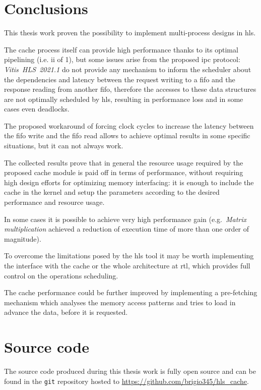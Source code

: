 \documentclass[11pt,a4paper,oneside]{memoir}
\begin{document}
\chapter{Conclusions}
This thesis work proven the possibility to implement multi-process designs in
\ac{hls}.

The cache process itself can provide high performance thanks to its optimal
pipelining (i.e. \ac{ii} of 1), but some issues arise from the proposed
\acl{ipc} protocol: \emph{Vitis~HLS~2021.1} do not provide any mechanism to
inform the scheduler about the dependencies and latency between the request
writing to a \ac{fifo} and the response reading from another \ac{fifo},
therefore the accesses to these data structures are not optimally scheduled by
\ac{hls}, resulting in performance loss and in some cases even deadlocks.

The proposed workaround of forcing clock cycles to increase the latency between
the \ac{fifo} write and the \ac{fifo} read allows to achieve optimal results in
some specific situations, but it can not always work.

\bigskip
The collected results prove that in general the resource usage required by the
proposed cache module is paid off in terms of performance, without requiring
high design efforts for optimizing memory interfacing: it is enough to include
the cache in the kernel and setup the parameters according to the desired
performance and resource usage.

In some cases it is possible to achieve very high performance gain (e.g.\
\emph{Matrix multiplication} achieved a reduction of execution time of more
than one order of magnitude).

\bigskip
To overcome the limitations posed by the \ac{hls} tool it may be worth
implementing the interface with the cache or the whole architecture at
\ac{rtl}, which provides full control on the operations scheduling.

The cache performance could be further improved by implementing a pre-fetching
mechanism which analyses the memory access patterns and tries to load in advance
the data, before it is requested.

\appendix
\chapter{Source code}
The source code produced during this thesis work is fully open source and can
be found in the \texttt{git} repository hosted to
\url{https://github.com/brigio345/hls_cache}.
\end{document}
